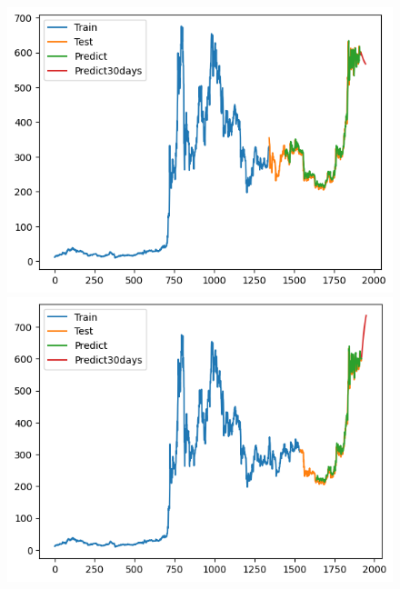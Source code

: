 \documentclass[conference]{IEEEtran}
\begin{document}
	        \begin{figure}[H]
			\centering
			\begin{minipage}{0.15\textwidth}
				\centering
				\includegraphics[width=1\textwidth]{Figure/GRU_BNB_73.png}
			\end{minipage}
			\hfill
			\begin{minipage}{0.15\textwidth}
				\centering
				\includegraphics[width=1\textwidth]{Figure/GRU_BNB_82.png}
			\end{minipage}
			\hfill
			\begin{minipage}{0.15\textwidth}
				\centering

\end{minipage}
\end{figure}
\end{document}
